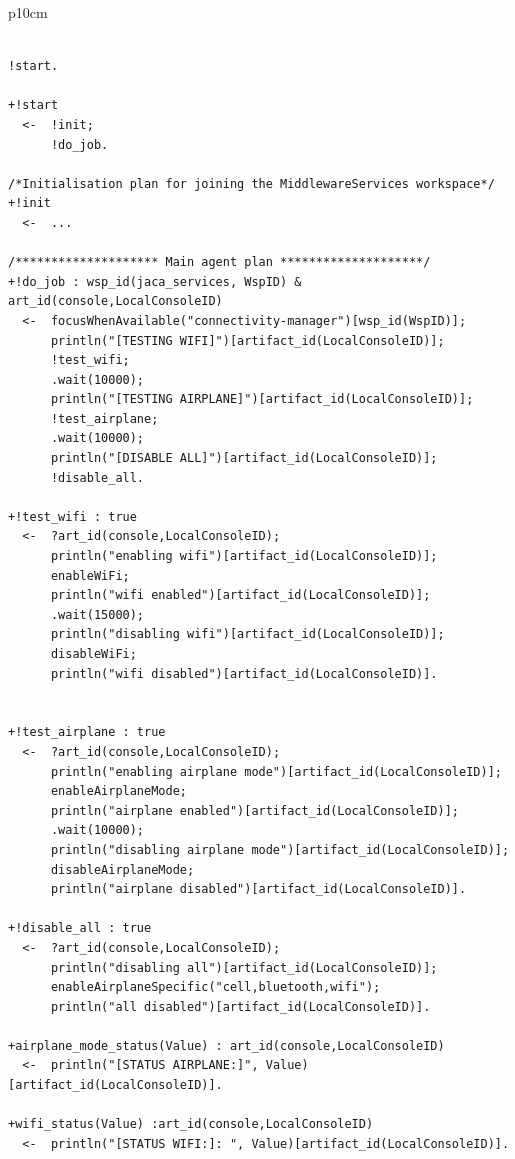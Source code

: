 \documentclass[11pt]{report}
\newcommand\labeltab[1]{\label{tb:#1}}
\newcommand{\jason}{\mbox{\sf{\emph{{Jason}}}}}
\begin{document}
\begin{table}[!h]
\begin{tabular} {p{10cm}}
\begin{minipage}{10cm}
{\scriptsize \begin{verbatim}

!start.

+!start
  <-  !init;
      !do_job.

/*Initialisation plan for joining the MiddlewareServices workspace*/
+!init 
  <-  ...
		
/******************** Main agent plan ********************/		
+!do_job : wsp_id(jaca_services, WspID) & art_id(console,LocalConsoleID)
  <-  focusWhenAvailable("connectivity-manager")[wsp_id(WspID)];
      println("[TESTING WIFI]")[artifact_id(LocalConsoleID)];
      !test_wifi;
      .wait(10000);
      println("[TESTING AIRPLANE]")[artifact_id(LocalConsoleID)];
      !test_airplane;
      .wait(10000);
      println("[DISABLE ALL]")[artifact_id(LocalConsoleID)];
      !disable_all.
		
+!test_wifi : true
  <-  ?art_id(console,LocalConsoleID);
      println("enabling wifi")[artifact_id(LocalConsoleID)];
      enableWiFi;
      println("wifi enabled")[artifact_id(LocalConsoleID)];
      .wait(15000);
      println("disabling wifi")[artifact_id(LocalConsoleID)];
      disableWiFi;
      println("wifi disabled")[artifact_id(LocalConsoleID)].
	   

+!test_airplane : true
  <-  ?art_id(console,LocalConsoleID);
      println("enabling airplane mode")[artifact_id(LocalConsoleID)];
      enableAirplaneMode;
      println("airplane enabled")[artifact_id(LocalConsoleID)];
      .wait(10000);
      println("disabling airplane mode")[artifact_id(LocalConsoleID)];
      disableAirplaneMode;
      println("airplane disabled")[artifact_id(LocalConsoleID)].

+!disable_all : true
  <-  ?art_id(console,LocalConsoleID);
      println("disabling all")[artifact_id(LocalConsoleID)];
      enableAirplaneSpecific("cell,bluetooth,wifi");
      println("all disabled")[artifact_id(LocalConsoleID)].
	
+airplane_mode_status(Value) : art_id(console,LocalConsoleID)
  <-  println("[STATUS AIRPLANE:]", Value)[artifact_id(LocalConsoleID)].
	
+wifi_status(Value) :art_id(console,LocalConsoleID)
  <-  println("[STATUS WIFI:]: ", Value)[artifact_id(LocalConsoleID)].
\end{verbatim}}
\end{minipage}
\end{tabular}
\caption{Source code snippet of the \jason{} agent used in this test.}
    \labeltab{test4agent}
\end{table}
\clearpage
\end{document}

